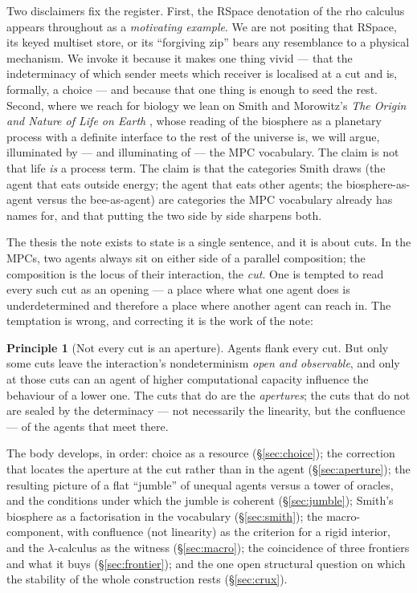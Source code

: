 \documentclass[11pt]{article}
\theoremstyle{definition}
\newtheorem{principle}{Principle}
\theoremstyle{plain}
\theoremstyle{remark}
\begin{document}
Two disclaimers fix the register. First, the RSpace denotation of the rho
calculus \cite{qcs,paths} appears throughout as a \emph{motivating example}. We
are not positing that RSpace, its keyed multiset store, or its ``forgiving zip''
bears any resemblance to a physical mechanism. We invoke it because it makes one
thing vivid --- that the indeterminacy of which sender meets which receiver is
localised at a cut and is, formally, a choice --- and because that one thing is
enough to seed the rest. Second, where we reach for biology we lean on Smith and
Morowitz's \emph{The Origin and Nature of Life on Earth} \cite{smith}, whose
reading of the biosphere as a planetary process with a definite interface to the
rest of the universe is, we will argue, illuminated by --- and illuminating of
--- the MPC vocabulary. The claim is not that life \emph{is} a process term. The
claim is that the categories Smith draws (the agent that eats outside energy; the
agent that eats other agents; the biosphere-as-agent versus the bee-as-agent) are
categories the MPC vocabulary already has names for, and that putting the two
side by side sharpens both.

The thesis the note exists to state is a single sentence, and it is about cuts.
In the MPCs, two agents always sit on either side of a parallel composition; the
composition is the locus of their interaction, the \emph{cut}. One is tempted to
read every such cut as an opening --- a place where what one agent does is
underdetermined and therefore a place where another agent can reach in. The
temptation is wrong, and correcting it is the work of the note:

\begin{principle}[Not every cut is an aperture]\label{prin:main}
Agents flank every cut. But only some cuts leave the interaction's
nondeterminism \emph{open and observable}, and only at those cuts can an agent
of higher computational capacity influence the behaviour of a lower one.
The cuts that do are the \emph{apertures}; the cuts that do not are sealed by
the determinacy --- not necessarily the linearity, but the confluence --- of
the agents that meet there.
\end{principle}

\noindent
The body develops, in order: choice as a resource (\S\ref{sec:choice}); the
correction that locates the aperture at the cut rather than in the agent
(\S\ref{sec:aperture}); the resulting picture of a flat ``jumble'' of unequal
agents versus a tower of oracles, and the conditions under which the jumble is
coherent (\S\ref{sec:jumble}); Smith's biosphere as a factorisation in the
vocabulary (\S\ref{sec:smith}); the macro-component, with confluence (not
linearity) as the criterion for a rigid interior, and the $\lambda$-calculus as
the witness (\S\ref{sec:macro}); the coincidence of three frontiers and what it
buys (\S\ref{sec:frontier}); and the one open structural question on which the
stability of the whole construction rests (\S\ref{sec:crux}).
\end{document}

